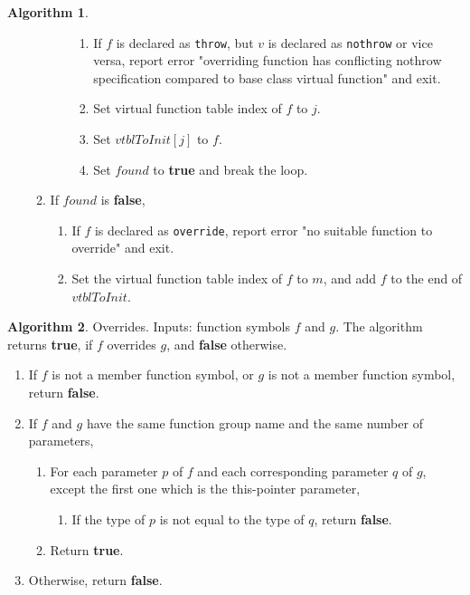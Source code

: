 \documentclass[a4paper,oneside,11pt]{book}
\theoremstyle{definition}
\newtheorem{algo}{Algorithm}[section]
\begin{document}
\begin{algo}
\begin{enumerate}
\begin{enumerate}
\begin{enumerate}
\begin{enumerate}
\item
If $f$ is declared as \verb|throw|, but $v$ is declared as \verb|nothrow| or vice versa, report error
"overriding function has conflicting nothrow specification compared to base class virtual function" and exit.
\item
Set virtual function table index of $f$ to $j$.
\item
Set $vtblToInit[j]$ to $f$.
\item
Set $found$ to \textbf{true} and break the loop.
\end{enumerate}
\end{enumerate}
\item
If $found$ is \textbf{false},
\begin{enumerate}
\item
If $f$ is declared as \verb|override|, report error "no suitable function to override" and exit.
\item
Set the virtual function table index of $f$ to $m$, and add $f$ to the end of $vtblToInit$.
\end{enumerate}
\end{enumerate}
\end{enumerate}
\end{algo}

\begin{algo}\label{overrides} Overrides. Inputs: function symbols $f$ and $g$.
The algorithm returns \textbf{true}, if $f$ overrides $g$, and \textbf{false} otherwise.
\begin{enumerate}
\item
If $f$ is not a member function symbol, or $g$ is not a member function symbol, return \textbf{false}.
\item
If $f$ and $g$ have the same function group name and the same number of parameters,
\begin{enumerate}
\item
For each parameter $p$ of $f$ and each corresponding parameter $q$ of $g$, except the first one which is the this-pointer parameter,
\begin{enumerate}
\item
If the type of $p$ is not equal to the type of $q$, return \textbf{false}.
\end{enumerate}
\item
Return \textbf{true}.
\end{enumerate}
\item
Otherwise, return \textbf{false}.
\end{enumerate}
\end{algo}
\end{document}
